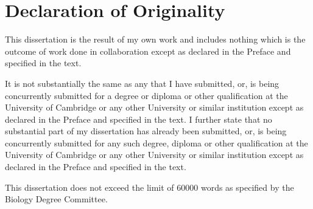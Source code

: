 \chapter*{Declaration of Originality}
This dissertation is the result of my own work and includes nothing which is the outcome of work done in collaboration except as declared in the Preface and specified in the text.

It is not substantially the same as any that I have submitted, or, is being concurrently submitted for a degree or diploma or other qualification at the University of Cambridge or any other University or similar institution except as declared in the Preface and specified in the text. I further state that no substantial part of my dissertation has already been submitted, or, is being concurrently submitted for any such degree, diploma or other qualification at the University of Cambridge or any other University or similar institution except as declared in the Preface and specified in the text. 

This dissertation does not exceed the limit of \num{60000} words as specified by the Biology Degree Committee.